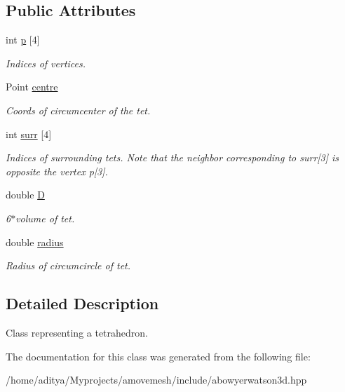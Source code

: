 \subsection*{Public Attributes}
\begin{DoxyCompactItemize}
\item 
\hypertarget{classTet_a2746be9af9d91c77505b44b4df0d7187}{int \hyperlink{classTet_a2746be9af9d91c77505b44b4df0d7187}{p} \mbox{[}4\mbox{]}}\label{classTet_a2746be9af9d91c77505b44b4df0d7187}

\begin{DoxyCompactList}\small\item\em Indices of vertices. \end{DoxyCompactList}\item 
\hypertarget{classTet_a96866fe360098dd0814fc1f0986991c2}{Point \hyperlink{classTet_a96866fe360098dd0814fc1f0986991c2}{centre}}\label{classTet_a96866fe360098dd0814fc1f0986991c2}

\begin{DoxyCompactList}\small\item\em Coords of circumcenter of the tet. \end{DoxyCompactList}\item 
\hypertarget{classTet_a9b0581379e76e63f9ef0b3fe43ec15c5}{int \hyperlink{classTet_a9b0581379e76e63f9ef0b3fe43ec15c5}{surr} \mbox{[}4\mbox{]}}\label{classTet_a9b0581379e76e63f9ef0b3fe43ec15c5}

\begin{DoxyCompactList}\small\item\em Indices of surrounding tets. Note that the neighbor corresponding to surr\mbox{[}3\mbox{]} is opposite the vertex p\mbox{[}3\mbox{]}. \end{DoxyCompactList}\item 
\hypertarget{classTet_ac1cbe6993c0a0804272c5faabc65bc0c}{double \hyperlink{classTet_ac1cbe6993c0a0804272c5faabc65bc0c}{D}}\label{classTet_ac1cbe6993c0a0804272c5faabc65bc0c}

\begin{DoxyCompactList}\small\item\em 6$\ast$volume of tet. \end{DoxyCompactList}\item 
\hypertarget{classTet_a7306f9a3f8047b993f846e2599e814ad}{double \hyperlink{classTet_a7306f9a3f8047b993f846e2599e814ad}{radius}}\label{classTet_a7306f9a3f8047b993f846e2599e814ad}

\begin{DoxyCompactList}\small\item\em Radius of circumcircle of tet. \end{DoxyCompactList}\end{DoxyCompactItemize}


\subsection{Detailed Description}
Class representing a tetrahedron. 

The documentation for this class was generated from the following file\-:\begin{DoxyCompactItemize}
\item 
/home/aditya/\-Myprojects/amovemesh/include/abowyerwatson3d.\-hpp\end{DoxyCompactItemize}
